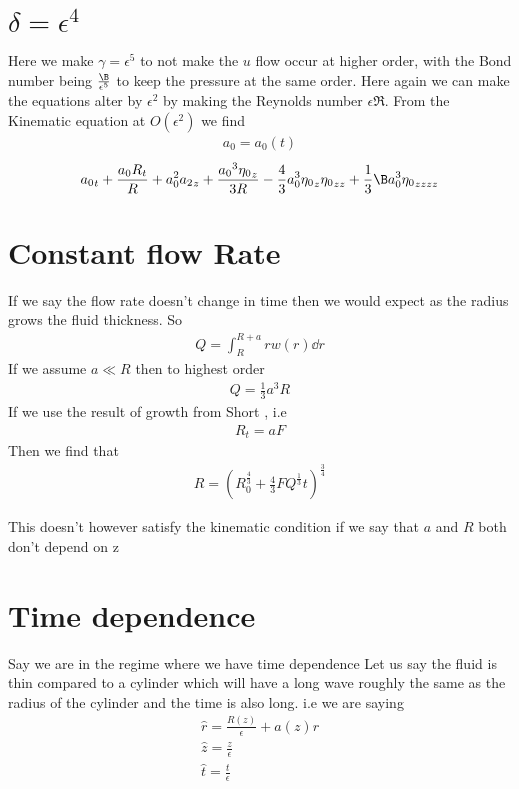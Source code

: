 \documentclass[12pt]{article}
\begin{document}
\section{$\delta = \epsilon^4$}
Here we make $\gamma= \epsilon^5$ to not make the $u$ flow occur at higher order, with the Bond number being $\frac{\B}{\epsilon^5}$ to keep the pressure at the same order. Here again we can make the equations alter by $\epsilon^2$ by making the Reynolds number $\epsilon\Re$. From the Kinematic equation at $O(\epsilon^2)$ we find 
\begin{align}
a_0 = a_0(t)
\end{align}
\begin{align}
{a_0}_t +\frac{a_0R_t}{R} + a_0^2{a_2}_z + \frac{{a_0}^3{\eta_0}_z}{3R} -\frac{4}{3}a_0^3{\eta_0}_z{\eta_0}_{zz} + \frac{1}{3}\B a_0^3{\eta_0}_{zzzz}
\end{align}

\section{Constant flow Rate}
If we say the flow rate doesn't change in time then we would expect as the radius grows the fluid thickness. So 
\begin{align}
Q = \int_{R}^{R+a} r w(r)\dd{r}
\end{align}
If we assume $a\ll R$ then to highest order
\begin{align}Q = \frac{1}{3}a^3 R
\end{align}
If we use the result of growth from Short \cite{short}, i.e
\begin{align}
R_t = a F
\end{align}
Then we find that 
\begin{align}
R= (R_0^{\frac{4}{3}}+\tfrac{4}{3}FQ^{\frac{1}{3}}t)^{\frac{3}{4}}
\end{align}

This doesn't however satisfy the kinematic condition if we say that $a$ and $R$ both don't depend on z
\section{Time dependence}
Say we are in the regime where we have time dependence
Let us say the fluid is thin compared to a cylinder which will have a long wave roughly the same as the radius of the cylinder and the time is also long.
i.e we are saying 
\begin{align}
\hat r = \frac{R(z)}{\epsilon} + a(z) r\\
\hat z  = \frac{z}{\epsilon}\\
\hat t  = \frac{t}{\epsilon}
\end{align}
\end{document}
